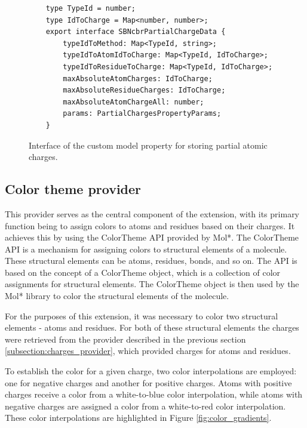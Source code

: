 \documentclass[
  digital,     %
  oneside,     %
  nosansbold,  %
  nocolorbold, %
  lof,         %
  lot,         %
]{fithesis4}
\begin{document}
\begin{figure}[htbp]
  \caption{Interface of the custom model property for storing partial atomic charges.}
  \label{fig:custom_model_property}
  \begin{verbatim}
    type TypeId = number;
    type IdToCharge = Map<number, number>;
    export interface SBNcbrPartialChargeData {
        typeIdToMethod: Map<TypeId, string>;
        typeIdToAtomIdToCharge: Map<TypeId, IdToCharge>;
        typeIdToResidueToCharge: Map<TypeId, IdToCharge>;
        maxAbsoluteAtomCharges: IdToCharge;
        maxAbsoluteResidueCharges: IdToCharge;
        maxAbsoluteAtomChargeAll: number;
        params: PartialChargesPropertyParams;
    }
  \end{verbatim}
\end{figure}

\subsection{Color theme provider}
\label{subsection:color_theme_provider}


This provider serves as the central component of the extension, with its primary function being to assign colors to atoms and residues based on their charges. It achieves this by using the ColorTheme API provided by Mol*. The ColorTheme API is a mechanism for assigning colors to structural elements of a molecule. These structural elements can be atoms, residues, bonds, and so on. The API is based on the concept of a ColorTheme object, which is a collection of color assignments for structural elements. The ColorTheme object is then used by the Mol* library to color the structural elements of the molecule.

For the purposes of this extension, it was necessary to color two structural elements - atoms and residues. For both of these structural elements the charges were retrieved from the provider described in the previous section \ref{subsection:charges_provider}, which provided charges for atoms and residues.

To establish the color for a given charge, two color interpolations are employed: one for negative charges and another for positive charges. Atoms with positive charges receive a color from a white-to-blue color interpolation, while atoms with negative charges are assigned a color from a white-to-red color interpolation. These color interpolations are highlighted in Figure \ref{fig:color_gradients}. 
\end{document}
